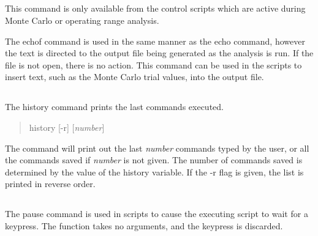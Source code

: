 \subsection{}


This command is only available from the control scripts which are
active during Monte Carlo or operating range analysis. 

The {\cb echof} command is used in the same manner as the {\cb echo}
command, however the text is directed to the output file being
generated as the analysis is run.  If the file is not open, there is
no action.  This command can be used in the scripts to insert text,
such as the Monte Carlo trial values, into the output file.

\subsection{}


The {\cb history} command prints the last commands executed.
\begin{quote}\vt
history [-r] [{\it number\/}]
\end{quote}
The command will print out the last {\it number} commands typed by the
user, or all the commands saved if {\it number} is not given.  The
number of commands saved is determined by the value of the {\et
history} variable.  If the {\vt -r} flag is given, the list is printed
in reverse order.

\subsection{}


The {\cb pause} command is used in scripts to cause the executing
script to wait for a keypress.  The function takes no arguments, and
the keypress is discarded.

\subsection{}

